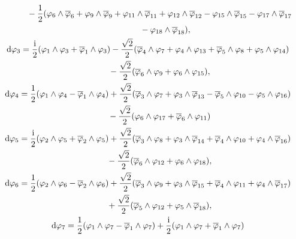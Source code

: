 \documentclass[10pt,a4paper]{amsart}
\numberwithin{equation}{section}
\begin{document}
\begin{Example}
\begin{gather*}
\hphantom{{\rm d} \varphi_2 =}{}
 - \frac{1}{2} ( \varphi_6 \wedge \overline \varphi_6 + \varphi_9 \wedge \overline \varphi_9 + \varphi_{11} \wedge \overline \varphi_{11} + \varphi_{12} \wedge \overline \varphi_{12} - \varphi_{15} \wedge \overline \varphi_{15} -\varphi_{17} \wedge \overline \varphi_{17}\\
\hphantom{{\rm d} \varphi_2 =\frac{{\rm i}}{2} (}{}
 -\varphi_{18} \wedge \overline \varphi_{18}),\\
{\rm d} \varphi_3 = \frac{{\rm i}}{2} (\varphi_1 \wedge \varphi_3+ \overline \varphi_1 \wedge \varphi_3) - \frac{\sqrt{2}}{2} ( \overline \varphi_4 \wedge \varphi_7 + \varphi_4 \wedge \varphi_{13} + \overline \varphi_5 \wedge \varphi_8 + \varphi_5 \wedge \varphi_{14} )\\
\hphantom{{\rm d} \varphi_{9} =}{} - \frac{\sqrt{2}}{2} (\overline \varphi_6 \wedge \varphi_9 + \varphi_6 \wedge \varphi_{15}),\\
{\rm d} \varphi_4 = \frac{1}{2} (\varphi_1 \wedge \varphi_4 - \overline \varphi_1 \wedge \varphi_4)+ \frac{\sqrt{2}}{2} (\overline \varphi_3 \wedge \varphi_7 + \varphi_3 \wedge \overline \varphi_{13} - \overline \varphi_5 \wedge \varphi_{10} - \varphi_5 \wedge \varphi_{16} )\\
\hphantom{{\rm d} \varphi_{9} =}{} - \frac{\sqrt{2}}{2} (\varphi_6 \wedge \varphi_{17} + \overline \varphi_6 \wedge \varphi_{11})\\
{\rm d} \varphi_5 = \frac{{\rm i}}{2} (\varphi_2 \wedge \varphi_5+ \overline \varphi_2 \wedge \varphi_5) + \frac{\sqrt{2}}{2} ( \overline \varphi_3 \wedge \varphi_8 + \varphi_3 \wedge \overline \varphi_{14} + \overline \varphi_4 \wedge \varphi_{10} + \varphi_4 \wedge \overline \varphi_{16} )\\
\hphantom{{\rm d} \varphi_{9} =}{} - \frac{\sqrt{2}}{2} (\overline \varphi_6 \wedge \varphi_{12} + \varphi_6 \wedge \varphi_{18}),\\
{\rm d} \varphi_6 = \frac{1}{2} (\varphi_2 \wedge \varphi_6- \overline \varphi_2 \wedge \varphi_6) + \frac{\sqrt{2}}{2} ( \overline \varphi_3 \wedge \varphi_9 + \varphi_3 \wedge \overline \varphi_{15} + \overline \varphi_4 \wedge \varphi_{11} + \varphi_4 \wedge \overline \varphi_{17} )\\
\hphantom{{\rm d} \varphi_{9} =}{} + \frac{\sqrt{2}}{2} (\overline \varphi_5 \wedge \varphi_{12} + \varphi_5 \wedge \overline \varphi_{18}),\\
{\rm d} \varphi_7 = \frac{1}{2} (\varphi_1 \wedge \varphi_7 - \overline \varphi_1 \wedge \varphi_7) + \frac{{\rm i}}{2} ( \varphi_1 \wedge \varphi_7 + \overline \varphi_1 \wedge \varphi_7)\\

\end{gather*}
\end{Example}
\end{document}
